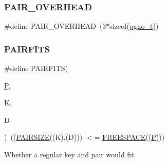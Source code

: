 \subsubsection{\texorpdfstring{PAIR\_OVERHEAD}{PAIR\_OVERHEAD}}
{\footnotesize\ttfamily \#define P\+A\+I\+R\+\_\+\+O\+V\+E\+R\+H\+E\+AD~(3$\ast$sizeof(\mbox{\hyperlink{adat-devel_2other__libs_2filedb_2filehash_2ffdb__db_8h_a000813331643d38481142bcce7de1501}{pgno\+\_\+t}}))}

\mbox{\label{adat-devel_2other__libs_2filedb_2filehash_2ffdb__page_8h_a087e59a6091c75459cb60d6815c145bd}} 
\subsubsection{\texorpdfstring{PAIRFITS}{PAIRFITS}\hspace{0.1cm}{\footnotesize\ttfamily [1/2]}}
{\footnotesize\ttfamily \#define P\+A\+I\+R\+F\+I\+TS(\begin{DoxyParamCaption}\item[{}]{\mbox{\hyperlink{adat__devel_2lib_2hadron_2operator__name__util_8cc_aef94be98e2c9e4a4dece75f60ca9792c}{P}},  }\item[{}]{K,  }\item[{}]{D }\end{DoxyParamCaption})~((\mbox{\hyperlink{adat__devel_2other__libs_2filedb_2filehash_2ffdb__page_8h_a63e9de9a7b2aeec52d911f3e884e8365}{P\+A\+I\+R\+S\+I\+ZE}}((K),(D))) $<$= \mbox{\hyperlink{adat__devel_2other__libs_2filedb_2filehash_2ffdb__page_8h_a6774480bfaf9d831352ae726a66a5465}{F\+R\+E\+E\+S\+P\+A\+CE}}((\mbox{\hyperlink{adat__devel_2lib_2hadron_2operator__name__util_8cc_aef94be98e2c9e4a4dece75f60ca9792c}{P}})))}

Whether a regular key and pair would fit \mbox{\label{adat-devel_2other__libs_2filedb_2filehash_2ffdb__page_8h_a087e59a6091c75459cb60d6815c145bd}} 
